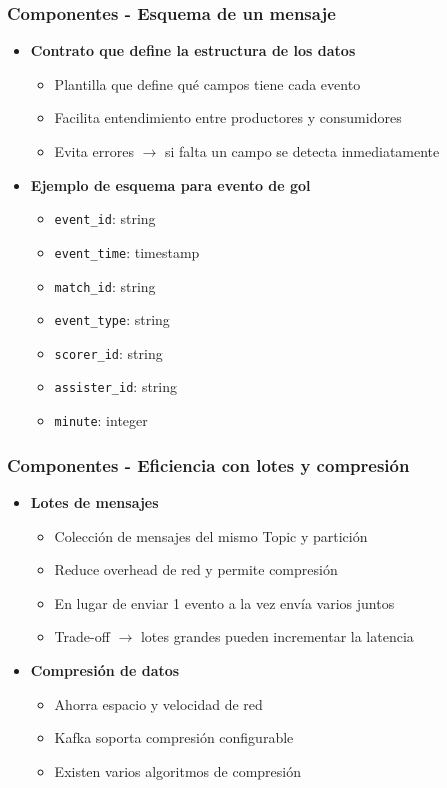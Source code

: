 \documentclass[aspectratio=169]{beamer}
\begin{document}
\begin{frame}\frametitle{Componentes - Esquema de un mensaje}
\begin{itemize}
  \item \textbf{Contrato que define la estructura de los datos}
  \begin{itemize}
    \item Plantilla que define qué campos tiene cada evento
    \item Facilita entendimiento entre productores y consumidores
    \item Evita errores $\rightarrow$ si falta un campo se detecta inmediatamente
  \end{itemize}

  \vspace{1em}

  \item \textbf{Ejemplo de esquema para evento de gol}
  \begin{itemize}
    \item \texttt{event\_id}: string
    \item \texttt{event\_time}: timestamp
    \item \texttt{match\_id}: string
    \item \texttt{event\_type}: string
    \item \texttt{scorer\_id}: string
    \item \texttt{assister\_id}: string
    \item \texttt{minute}: integer
  \end{itemize}

\end{itemize}
\end{frame}

\begin{frame}\frametitle{Componentes - Eficiencia con lotes y compresión}
\begin{itemize}
  \item \textbf{Lotes de mensajes}
  \begin{itemize}
    \item Colección de mensajes del mismo Topic y partición
    \item Reduce overhead de red y permite compresión
    \item En lugar de enviar 1 evento a la vez envía varios juntos
    \item Trade-off $\rightarrow$ lotes grandes pueden incrementar la latencia
  \end{itemize}

  \vspace{1em}

  \item \textbf{Compresión de datos}
  \begin{itemize}
    \item Ahorra espacio y velocidad de red
    \item Kafka soporta compresión configurable
    \item Existen varios algoritmos de compresión
  \end{itemize}
\end{itemize}
\end{frame}
\end{document}
